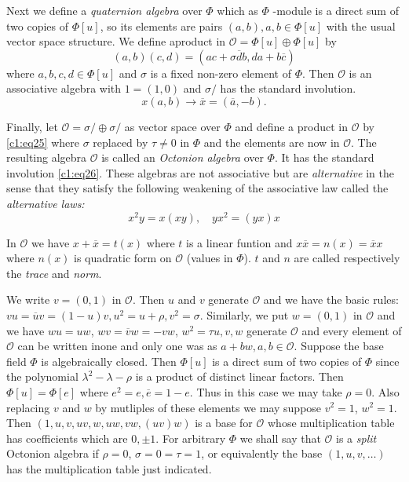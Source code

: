 Next we define a {\em quaternion algebra} over $\Phi$ which as $\Phi$
-module is a direct sum of two copies of $\Phi[u]$, so its elements
are pairs $(a,b),a,b\in \Phi [u]$ with the usual vector space
structure. We define a\pageoriginale product in $\mathcal{O}=\Phi[u]\oplus
\Phi[u]$ by 
\begin{equation*}
(a,b)(c,d)=(ac+\sigma \overline{d} b, da
  +b\overline{c})\tag{25}\label{c1:eq25} 
\end{equation*}
where $a,b,c,d\in\Phi [u]$ and $\sigma$ is a fixed non-zero
element of $\Phi$. Then $\mathcal{O}$ is an associative algebra with
$1=(1,0)$ and $\sigma/$ has the standard involution.
\begin{equation*}
x(a,b)\to \overline{x}=(\overline{a},-b).\tag{26}\label{c1:eq26} 
\end{equation*}

Finally, let $\mathcal{O}=\sigma/\oplus\sigma/$ as vector space over
$\Phi$ and define a product in $\mathcal{O}$ by \eqref{c1:eq25} where $\sigma$
replaced by $\tau \neq 0$ in $\Phi$ and the elements are now
in $\mathcal{O}$. The resulting algebra $\mathcal{O}$ is called an
{\em Octonion algebra} over $\Phi$. It has the standard involution
\eqref{c1:eq26}. These algebras are not associative but are {\em alternative}
in the sense that they satisfy the following weakening of the
associative law called the {\em alternative laws:}
\begin{equation*}
x^{2}y=x(xy),\quad yx^{2}=(yx)x\tag{27}\label{c1:eq27}
\end{equation*}

In $\mathcal{O}$ we have $x+\overline{x}=t(x)$ where $t$ is a linear
funtion and $x\overline{x}=n(x)=\overline{x} x$ where $n(x)$ is
quadratic form on $\mathcal{O}$ (values in $\Phi$). $t$ and  $n$ are
called respectively the {\em trace} and {\em norm}.

We write $v=(0,1)$ in $\mathscr{O}$. Then $u$ and $v$ generate $\mathscr{O}$
and we have the basic rules: $vu=\overline{u}v=(1-u)v,u^{2}=u+\rho,
v^{2}=\sigma$. Similarly, we put $w=(0,1)$ in $\mathcal{O}$ and we
have $wu=uw$, $wv=\overline{v}w=-vw$, $w^{2}=\tau u,v,w$ generate
$\mathcal{O}$ and every element of $\mathcal{O}$ can be written
in\pageoriginale one and only one was as $a+bw, a,b\in
\mathscr{O}$. Suppose the base field $\Phi$ is algebraically closed. Then
$\Phi[u]$ is a direct sum of two copies of $\Phi$ since the polynomial
$\lambda^{2}-\lambda -\rho$ is a product of distinct linear
factors. Then $\Phi[u]=\Phi[e]$ where $e^{2}=e,\overline{e}=1-e$. Thus
in this case we may take $\rho=0$. Also replacing $v$ and $w$ by
mutliples of these elements we may suppose $v^{2}=1$, $w^{2}=1$. Then
$(1,u,v,uv,w,uw,vw, (uv)w)$ is a base for $\mathcal{O}$ whose
multiplication table has coefficients which are $0,\pm 1$. For
arbitrary $\Phi$ we shall say that $\mathcal{O}$ is a {\em split}
Octonion algebra if $\rho=0$, $\sigma=0=\tau=1$, or equivalently the
base $(1,u, v,\ldots)$ has the multiplication table just indicated.


